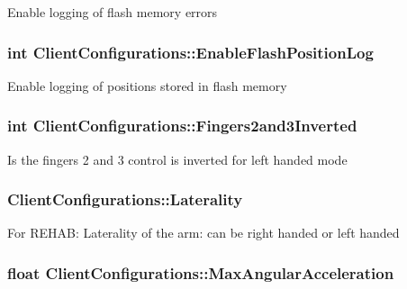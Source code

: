 Enable logging of flash memory errors \hypertarget{struct_client_configurations_ae0c7b4d0a3f91271e8138985807be8c6}{
\subsubsection[{Enable\-Flash\-Position\-Log}]{\setlength{\rightskip}{0pt plus 5cm}int Client\-Configurations\-::\-Enable\-Flash\-Position\-Log}}\label{struct_client_configurations_ae0c7b4d0a3f91271e8138985807be8c6}
Enable logging of positions stored in flash memory \hypertarget{struct_client_configurations_a55cb748c864cd65d8136da316b46df61}{
\subsubsection[{Fingers2and3\-Inverted}]{\setlength{\rightskip}{0pt plus 5cm}int Client\-Configurations\-::\-Fingers2and3\-Inverted}}\label{struct_client_configurations_a55cb748c864cd65d8136da316b46df61}
Is the fingers 2 and 3 control is inverted for left handed mode \hypertarget{struct_client_configurations_ab1da95ec401d00e7ea9bcff26fbfc0c3}{
\subsubsection[{Laterality}]{ Client\-Configurations\-::\-Laterality}}\label{struct_client_configurations_ab1da95ec401d00e7ea9bcff26fbfc0c3}
For R\-E\-H\-A\-B\-: Laterality of the arm\-: can be right handed or left handed \hypertarget{struct_client_configurations_a564aab9ca96f42161d7969c81bff1331}{
\subsubsection[{Max\-Angular\-Acceleration}]{\setlength{\rightskip}{0pt plus 5cm}float Client\-Configurations\-::\-Max\-Angular\-Acceleration}}\label{struct_client_configurations_a564aab9ca96f42161d7969c81bff1331}
